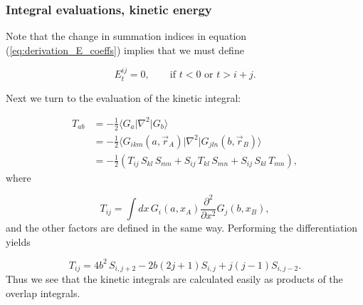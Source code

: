 \documentclass{beamer}
\begin{document}
\begin{frame}
\frametitle{Integral evaluations, kinetic energy}

\begin{block}{}

Note that the change in summation indices in equation (\ref{eq:derivation_E_coeffs}) implies that we must define

\begin{equation}
 E^{ij}_t = 0, \qquad \text{if }t<0\text{ or }t > i + j.
\end{equation}

Next we turn to the evaluation of the kinetic integral:

\begin{equation}
\begin{split}
T_{ab} & = -\frac{1}{2}\langle G_a\vert\nabla^2\vert G_b\rangle \\
       & = -\frac{1}{2}\langle G_{ikm}(a, \vec r_A)\vert\nabla^2\vert G_{jln}(b, \vec r_B)\rangle \\
       & = -\frac{1}{2}(T_{ij}\,S_{kl}\,S_{mn} + S_{ij}\,T_{kl}\,S_{mn} + S_{ij}\,S_{kl}\,T_{mn}),
\end{split}
\end{equation}
where

\begin{equation}
 T_{ij} = \int dx \,G_i(a,x_A)\frac{\partial^2}{\partial x^2}G_j(b,x_B),
\end{equation}
and the other factors are defined in the same way. Performing the differentiation yields

\begin{equation}
 T_{ij} = 4b^2\,S_{i,j+2} - 2b(2j + 1)S_{i,j} + j(j-1)S_{i,j-2}.
\end{equation}
Thus we see that the kinetic integrals are calculated easily as products of the overlap integrals.
\end{block}
\end{frame}
\end{document}
